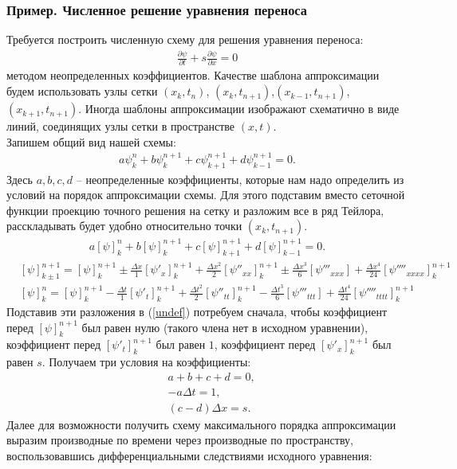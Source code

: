 \documentclass[12pt]{article}
\newcommand{\pt}{\partial t}
\newcommand{\px}{\partial x}
\newcommand{\p}{\partial}
\newcommand{\dt}{\Delta t}
\newcommand{\dx}{\Delta x}
\begin{document}
\subsubsection{Пример. Численное решение уравнения переноса}
Требуется построить численную схему для решения уравнения переноса:
\begin{align}
	\frac{\p \psi}{\pt} + s \frac{\p \psi}{\px} = 0
\end{align}
методом неопределенных коэффициентов. Качестве шаблона аппроксимации будем использовать узлы сетки $(x_k,t_n)$, $(x_k,t_{n+1})$,$(x_{k-1},t_{n+1})$,$(x_{k+1},t_{n+1})$. Иногда шаблоны аппроксимации изображают схематично в виде линий, соединящих узлы сетки в пространстве $(x,t)$.\\
Запишем общий вид нашей схемы:
\begin{align}
a\psi_{k}^{n}+b\psi_{k}^{n+1}+c\psi_{k+1}^{n+1}+d\psi_{k-1}^{n+1}=0.
\end{align} 
Здесь $a,b,c,d$ -- неопределенные коэффициенты, которые нам надо определить из условий на порядок аппроксимации схемы. Для этого подставим вместо сеточной функции проекцию точного решения на сетку и разложим все в ряд Тейлора, расскладывать будет удобно относительно точки $(x_k,t_{n+1})$.
\begin{align}\label{undef}
a[\psi]_{k}^{n}+b[\psi]_{k}^{n+1}+c[\psi]_{k+1}^{n+1}+d[\psi]_{k-1}^{n+1}=0.
\end{align}
\begin{align}
&[\psi]_{k\pm 1}^{n+1}=[\psi]_{k}^{n+1} \pm \frac{\dx}{1}[\psi'_x]_{k}^{n+1}+\frac{\dx^2}{2}[\psi''_{xx}]_{k}^{n+1} \pm \frac{\dx^3}{6}[\psi'''_{xxx}]+\frac{\dx^4}{24}[\psi''''_{xxxx}]_{k}^{n+1}\\
&[\psi]_{k}^{n}=[\psi]_{k}^{n+1} - \frac{\dt}{1}[\psi'_t]_{k}^{n+1}+\frac{\dt^2}{2}[\psi''_{tt}]_{k}^{n+1} - \frac{\dt^3}{6}[\psi'''_{ttt}]+\frac{\dt^4}{24}[\psi''''_{tttt}]_{k}^{n+1}
\end{align}
Подставив эти разложения в (\ref{undef}) потребуем сначала, чтобы коэффициент перед $[\psi]^{n+1}_k$ был равен нулю (такого члена нет в исходном уравнении), коэффициент перед $[\psi'_t]^{n+1}_k$ был равен $1$, коэффициент перед $[\psi'_x]^{n+1}_k$ был равен $s$. Получаем три условия на коэффициенты:
\begin{align}
&a+b+c+d=0,\\
&-a\dt=1, \\
&(c-d)\dx=s.
\end{align}
Далее для возможности получить схему максимального порядка аппроксимации выразим производные по времени через производные по пространству, воспользовавшись дифференциальными следствиями исходного уравнения:
\end{document}
